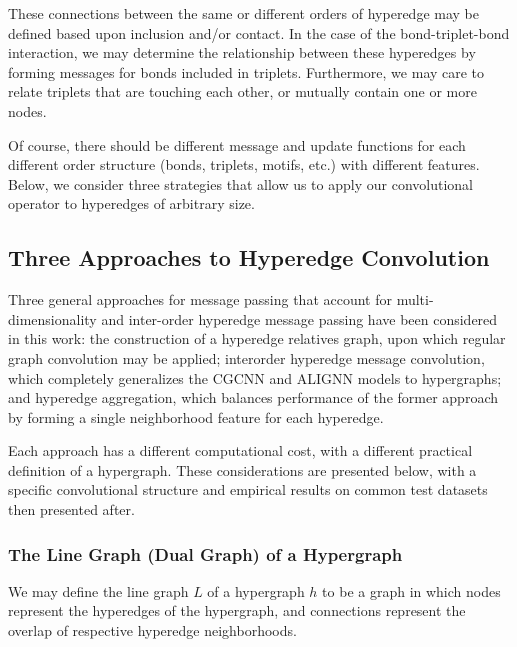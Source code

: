 \documentclass[10pt,a4paper]{article}
\begin{document}
These connections between the same or different orders of hyperedge may be defined based upon inclusion and/or contact. In the case of the bond-triplet-bond interaction, we may determine the relationship between these hyperedges by forming messages for bonds included in triplets. Furthermore, we may care to relate triplets that are touching each other, or mutually contain one or more nodes.

Of course, there should be different message and update functions for each different order structure (bonds, triplets, motifs, etc.) with different features. Below, we consider three strategies that allow us to apply our convolutional operator to hyperedges of arbitrary size.


\subsection{Three Approaches to Hyperedge Convolution}

Three general approaches for message passing that account for multi-dimensionality and inter-order hyperedge message passing have been considered in this work: the construction of a hyperedge relatives graph, upon which regular graph convolution may be applied; interorder hyperedge message convolution, which completely generalizes the CGCNN \cite{cgcnn} and ALIGNN \cite{alignn} models to hypergraphs; and hyperedge aggregation, which balances performance of the former approach by forming a single neighborhood feature for each hyperedge.

Each approach has a different computational cost, with a different practical definition of a hypergraph. These considerations are presented below, with a specific convolutional structure and empirical results on common test datasets then presented after.






\subsubsection{The Line Graph (Dual Graph) of a Hypergraph}
We may define the line graph $L$ of a hypergraph $h$ to be a graph in which nodes represent the hyperedges of the hypergraph, and connections represent the overlap of respective hyperedge neighborhoods. 
\end{document}
